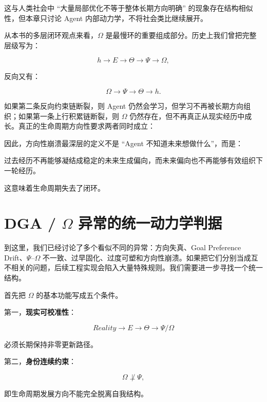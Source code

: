 这与人类社会中 ``大量局部优化不等于整体长期方向明确'' 的现象存在结构相似性，但本章只讨论 Agent 内部动力学，不将社会类比继续展开。

从本书的多层闭环观点来看，$\Omega$ 是最慢环的重要组成部分。历史上我们曾把完整层级写为：

\[
h
\rightarrow
E
\rightarrow
\Theta
\rightarrow
\Psi
\rightarrow
\Omega,
\]

反向又有：

\[
\Omega
\rightarrow
\Psi
\rightarrow
\Theta
\rightarrow
h.
\]

如果第二条反向约束链断裂，则 Agent 仍然会学习，但学习不再被长期方向组织；如果第一条上行积累链断裂，则 $\Omega$ 仍然存在，但不再真正从现实经历中成长。真正的生命周期方向性要求两者同时成立：

\begin{statementbox}
\centering
{}
\end{statementbox}

因此，方向性崩溃最深层的定义不是 ``Agent 不知道未来想做什么''，而是：

\begin{definition*}
过去经历不再能够凝结成稳定的未来生成偏向，而未来偏向也不再能够有效组织下一轮经历。
\end{definition*}

这意味着生命周期失去了闭环。

\section{DGA / $\Omega$ 异常的统一动力学判据}
\label{sec:omega_unified_diagnostics}

到这里，我们已经讨论了多个看似不同的异常：方向失真、Goal Preference Drift、$\Psi$--$\Omega$ 不一致、过早固化、过度可塑和方向性崩溃。如果把它们分别当成互不相关的问题，后续工程实现会陷入大量特殊规则。我们需要进一步寻找一个统一结构。

首先把 $\Omega$ 的基本功能写成五个条件。

第一，\textbf{现实可校准性}：

\[
Reality
\rightarrow
E
\rightarrow
\Theta
\rightarrow
\Psi/\Omega
\]

必须长期保持非零更新路径。

第二，\textbf{身份连续约束}：

\[
\Omega
\not\perp
\Psi,
\]

即生命周期发展方向不能完全脱离自我结构。

